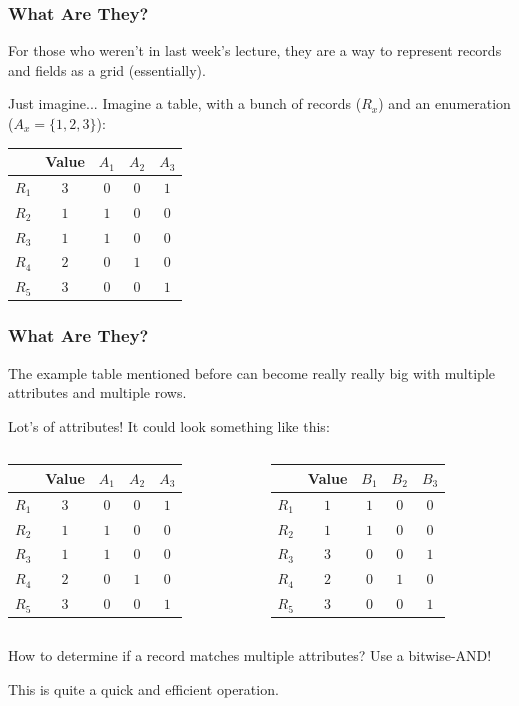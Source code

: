 \documentclass[11pt]{beamer}
\begin{document}
\begin{frame}
	\frametitle{What Are They?}
	
	For those who weren't in last week's lecture, they are a way to represent records and fields as a grid (essentially).
	
	\begin{exampleblock}{Just imagine...}
		Imagine a table, with a bunch of records ($R_x$) and an enumeration ($A_x = \{1, 2, 3\}$):
		
		\begin{tabular}{r|c|c|c|c}
				& \textbf{Value} & $A_1$ & $A_2$ & $A_3$ \\ \hline
			$R_1$ & $3$	& $0$	& $0$	& $1$ \\
			$R_2$ & $1$	& $1$	& $0$	& $0$ \\
			$R_3$ & $1$	& $1$	& $0$	& $0$ \\
			$R_4$ & $2$	& $0$	& $1$	& $0$ \\
			$R_5$ & $3$	& $0$	& $0$	& $1$ 
		\end{tabular}
	\end{exampleblock}
\end{frame}

\begin{frame}
	\frametitle{What Are They?}
	
	The example table mentioned before can become really really big with multiple attributes and multiple rows.
	\pause
	\begin{exampleblock}{Lot's of attributes!}
		It could look something like this:
		
		\begin{columns}[c]
			\begin{tabular}{r|c|c|c|c}
					& \textbf{Value} & $A_1$ & $A_2$ & $A_3$ \\ \hline
				$R_1$ & $3$	& $0$	& $0$	& $1$ \\
				$R_2$ & $1$	& $1$	& $0$	& $0$ \\
				$R_3$ & $1$	& $1$	& $0$	& $0$ \\
				$R_4$ & $2$	& $0$	& $1$	& $0$ \\
				$R_5$ & $3$	& $0$	& $0$	& $1$ 
			\end{tabular}
			\begin{tabular}{r|c|c|c|c}
					& \textbf{Value} & $B_1$ & $B_2$ & $B_3$ \\ \hline
				$R_1$ & $1$	& $1$	& $0$	& $0$ \\
				$R_2$ & $1$	& $1$	& $0$	& $0$ \\
				$R_3$ & $3$	& $0$	& $0$	& $1$ \\
				$R_4$ & $2$	& $0$	& $1$	& $0$ \\
				$R_5$ & $3$	& $0$	& $0$	& $1$ 
			\end{tabular}
		\end{columns}	
	\end{exampleblock}
	
	\pause
	How to determine if a record matches multiple attributes? Use a bitwise-AND!
	
	\pause
	This is quite a quick and efficient operation.
\end{frame}
\end{document}
